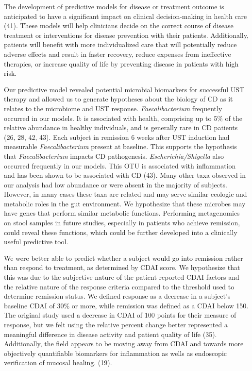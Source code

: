 \documentclass[12pt,]{article}
\begin{document}
The development of predictive models for disease or treatment outcome is
anticipated to have a significant impact on clinical decision-making in
health care (41). These models will help clinicians decide on the
correct course of disease treatment or interventions for disease
prevention with their patients. Additionally, patients will benefit with
more individualized care that will potentially reduce adverse effects
and result in faster recovery, reduce expenses from ineffective
therapies, or increase quality of life by preventing disease in patients
with high risk.

Our predictive model revealed potential microbial biomarkers for
successful UST therapy and allowed us to generate hypotheses about the
biology of CD as it relates to the microbiome and UST response.
\emph{Faecalibacterium} frequently occurred in our models. It is
associated with health, comprising up to 5\% of the relative abundance
in healthy individuals, and is generally rare in CD patients (26, 28,
42, 43). Each subject in remission 6 weeks after UST induction had
measurable \emph{Faecalibacterium} present at baseline. This supports
the hypothesis that \emph{Faecalibacterium} impacts CD pathogenesis.
\emph{Escherichia/Shigella} also occurred frequently in our models. This
OTU is associated with inflammation and has been shown to be associated
with CD (43). Many other taxa observed in our analysis had low abundance
or were absent in the majority of subjects. However, in many cases these
taxa are related and may serve similar ecologic and metabolic roles in
the gut environment. We hypothesize that these microbes may have genes
that perform similar metabolic functions. Performing metagenomics on
stool samples in future studies, especially in patients who achieve
remission, could reveal these functions, which could be further
developed into a clinically useful predictive tool.

We were better able to predict whether a subject would go into remission
rather than respond to treatment, as determined by CDAI score. We
hypothesize that this was due to the subjective nature of the
patient-reported CDAI factors and the relative nature of the response
criteria compared to the threshold used to determine remission status.
We defined response as a decrease in a subject's baseline CDAI of 30\%
or more, while remission was defined as a CDAI below 150. The original
study used a decrease in CDAI of 100 points for their measure of
response, but we felt using the relative percent change better
represented a meaningful difference in disease activity and patient
quality of life (35). Additionally, the field appears to be moving away
from CDAI and towards more objectively quantifiable biomarkers for
inflammation as wells as endoscopic verification of mucosal healing.
(19).
\end{document}
